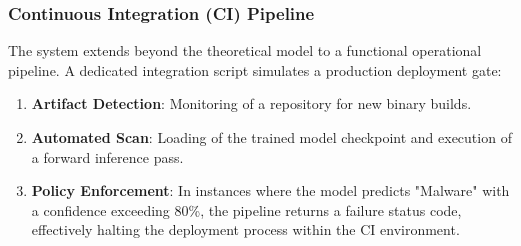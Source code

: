 \subsubsection{Continuous Integration (CI) Pipeline}
The system extends beyond the theoretical model to a functional operational pipeline. A dedicated integration script simulates a production deployment gate:
\begin{enumerate}
    \item \textbf{Artifact Detection}: Monitoring of a repository for new binary builds.
    \item \textbf{Automated Scan}: Loading of the trained model checkpoint and execution of a forward inference pass.
    \item \textbf{Policy Enforcement}: In instances where the model predicts "Malware" with a confidence exceeding 80\%, the pipeline returns a failure status code, effectively halting the deployment process within the CI environment.
\end{enumerate}
